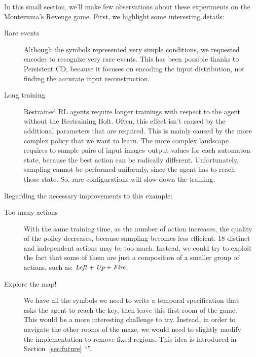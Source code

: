 In this small section, we'll make few observations about these experiments on
the Montezuma's Revenge game. First, we highlight some interesting details:
\begin{description}

	\item [Rare events] Although the symbols represented very simple conditions,
		we requested encoder to recognize very rare events. This has been possible
		thanks to Persistent CD, because it focuses on encoding the input
		distribution, not finding the accurate input reconstruction.

	\item [Long training] Restrained RL agents require longer trainings with
		respect to the agent without the Restraining Bolt. Often, this effect
		isn't caused by the additional parameters that are required. This is
		mainly caused by the more complex policy that we want to learn. The more
		complex landscape requires to sample pairs of input images--output values
		for each automaton state, because the best action can be radically
		different. Unfortunately, sampling cannot be performed uniformly, since the
		agent has to reach those state. So, rare configurations will slow down the
		training.

\end{description}

Regarding the necessary improvements to this example:
\begin{description}

	\item [Too many actions] With the same training time, as the number of
		action increases, the quality of the policy decreases, because sampling
		becomes less efficient. 18 distinct and independent actions may be too
		much. Instead, we could try to exploit the fact that some of them are just
		a composition of a smaller group of actions, such as: $\text{\textit{Left}} +
		\text{\textit{Up}} + \text{\textit{Fire}}$.

	\item [Explore the map!] We have all the symbols we need to write a temporal
		specification that asks the agent to reach the key, then leave this first
		room of the game. This would be a more interesting challenge to try.
		Instead, in order to navigate the other rooms of the maze, we would need
		to slightly modify the implementation to remove fixed regions. This idea
		is introduced in Section~\ref{sec:future} ``''.

\end{description}

